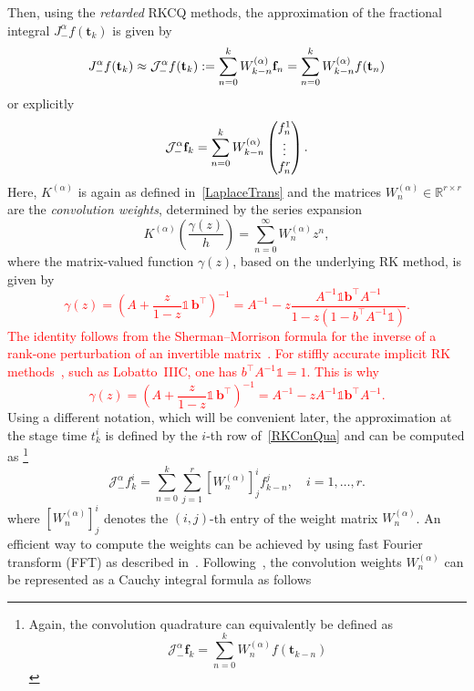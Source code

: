 \documentclass[a4paper,10pt,reqno]{amsart}
\theoremstyle{definition}
\newcommand{\lp}{\left(}
\newcommand{\rp}{\right)}
\newcommand{\R}{\mathbb{R}}      %
\begin{document}
Then, using the \textit{retarded} RKCQ methods, the approximation of the fractional integral $J_-^\alpha f(\mathbf{t}_k)$   is given by
\begin{equation}\label{RKConQua}
J_{-}^{\alpha}f(\mathbf t_k)\approx\mathcal{J}_{-}^{\alpha}f(\mathbf t_k):=\sum_{n=0}^{k}W_{k-n}^{(\alpha)}{\bf f}_{n}=\sum_{n=0}^{k}W_{k-n}^{(\alpha)}f({\bf t}_n)
\end{equation}
or explicitly
$$\mathcal{J}_{-}^{\alpha}{\bf f}_k= \sum_{n=0}^kW_{k-n}^{(\alpha)}\begin{pmatrix}
{f}^{1}_{n}\\
\vdots\\
{f}^{ r }_{n}
\end{pmatrix}.$$
Here, $K^{(\alpha)}$ is again as defined in~\eqref{LaplaceTrans} and the matrices $W_n^{(\alpha)}\in\R^{ r \times  r}$ are the  {\it convolution weights},  determined by the series expansion
 \begin{equation}\label{eq:series}
    K^{(\alpha)}\lp\frac{\gamma(z)}{h}\rp=\sum_{n=0}^{\infty}W_n^{(\alpha)}z^n,
 \end{equation}
where the matrix-valued function $\gamma(z)$, based on the underlying RK method, is given by 
\textcolor{red}{\[
\gamma(z)=\lp  A +\frac{z}{1-z}\mathds{1}\,\mathbf b^\top \rp^{-1}= A ^{-1}-z \frac{A ^{-1}\mathds{1}\mathbf  b^\top  A ^{-1}}{1-z\left(1-b^\top A^{-1}\mathds{1}\right)}.
\]
The identity follows from the Sherman–Morrison formula for the inverse of a rank-one perturbation of an invertible matrix~\cite{LehSaBook,LuOs}. For stiffly accurate implicit RK methods~\cite[Proposition 3.8]{HaWa}, such as Lobatto~IIIC, one has $b^\top A^{-1}\mathds{1}=1$. This is why
\[\gamma(z)=\lp  A +\frac{z}{1-z}\mathds{1}\,\mathbf b^\top \rp^{-1}= A ^{-1}-z A ^{-1}\mathds{1}\mathbf  b^\top  A ^{-1}.
\]
}
Using a different notation, which will be convenient later, the approximation at the stage time $t_k^i$ is defined by the $i$-th row of~\eqref{RKConQua} and can be computed   as \footnote{Again, the convolution quadrature can equivalently  be defined as
\[
\mathcal{J}_{-}^{\alpha}\mathbf f_k=\sum_{n=0}^{k}W_{n}^{(\alpha)}f(\mathbf t_{k-n})
\]
}
\begin{equation}\label{explicit_RKCQ}
    \mathcal{J}_{-}^{\alpha}f_k^i=\sum_{n=0}^{k} \sum_{j=1}^{r} \left[W_n^{(\alpha)}\right]_{j}^if_{k-n}^j, \quad i=1,\ldots, r.
\end{equation}
where $\left[W_n^{(\alpha)}\right]_{j}^i$ denotes the 
$(i,j)$-th entry of the weight matrix $W_n^{(\alpha)}$.
An efficient way to  compute the weights can be achieved by using fast Fourier transform (FFT) as described in~\cite{LuOs}. Following~\cite[Section 5.4]{LehSaBook}, the convolution weights $W_n^{(\alpha)}$ can be represented as a Cauchy integral formula as follows
\end{document}
